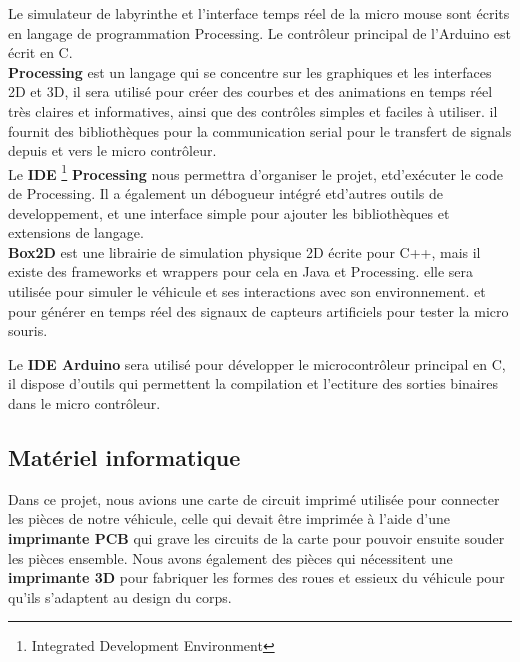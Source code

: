    Le simulateur de labyrinthe et l'interface temps réel de la micro mouse sont
écrits en langage de programmation Processing. Le contrôleur principal de
l'Arduino est écrit en C. \\


   \textbf{Processing} est un langage qui se concentre sur les graphiques et
les interfaces 2D et 3D, il sera utilisé pour créer des courbes et des
animations en temps réel très claires et informatives, ainsi que des
contrôles simples et faciles à utiliser. il fournit des bibliothèques pour
la communication serial pour le transfert de signals depuis et vers le micro
contrôleur. \\

 
   Le \textbf{IDE} \footnote{Integrated Development Environment}
\textbf{Processing} nous permettra d'organiser le projet, etd'exécuter le
code de Processing.  Il a également un débogueur intégré etd'autres
outils de developpement, et une interface simple pour ajouter
les bibliothèques et extensions de langage. \\ 


   \textbf{Box2D} est une librairie de simulation physique 2D écrite pour C++,
mais il existe des frameworks et wrappers pour cela en Java et Processing.
elle sera utilisée pour simuler le véhicule et ses interactions avec son
environnement. et pour générer en temps réel des signaux de capteurs
artificiels pour tester la micro souris. \\


   Le \textbf{IDE Arduino} sera utilisé pour développer le microcontrôleur
principal en C, il dispose d'outils qui permettent la compilation et
l'ectiture des sorties binaires dans le micro contrôleur. \\

\subsection{Matériel informatique} \label{subsec:hardDev}
Dans ce projet, nous avions une carte de circuit imprimé utilisée pour
connecter les pièces de notre véhicule, celle qui devait être imprimée à l'aide
d'une \textbf{imprimante PCB} qui grave les circuits de la carte pour pouvoir
ensuite souder les pièces ensemble. Nous avons également des pièces qui
nécessitent une \textbf{imprimante 3D} pour fabriquer les formes des roues et
essieux du véhicule pour qu'ils s'adaptent au design du corps.    